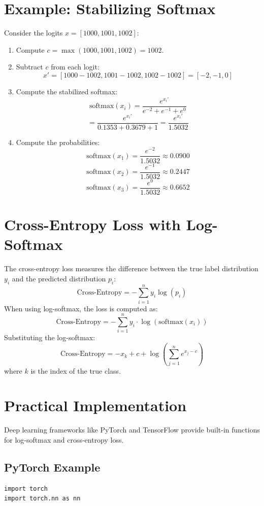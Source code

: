 \begin{notechapter}
\section{Example: Stabilizing Softmax}
Consider the logits \( x = [1000, 1001, 1002] \):
\begin{enumerate}
    \item Compute \( c = \max(1000, 1001, 1002) = 1002 \).
    \item Subtract \( c \) from each logit:
    \[
    x' = [1000 - 1002, 1001 - 1002, 1002 - 1002] = [-2, -1, 0]
    \]
    \item Compute the stabilized softmax:
    \[
    \text{softmax}(x_i) = \frac{e^{x_i'}}{e^{-2} + e^{-1} + e^{0}}
    \]
    \[
    = \frac{e^{x_i'}}{0.1353 + 0.3679 + 1} = \frac{e^{x_i'}}{1.5032}
    \]
    \item Compute the probabilities:
    \[
    \text{softmax}(x_1) = \frac{e^{-2}}{1.5032} \approx 0.0900
    \]
    \[
    \text{softmax}(x_2) = \frac{e^{-1}}{1.5032} \approx 0.2447
    \]
    \[
    \text{softmax}(x_3) = \frac{e^{0}}{1.5032} \approx 0.6652
    \]
\end{enumerate}

\section{Cross-Entropy Loss with Log-Softmax}
The cross-entropy loss measures the difference between the true label 
distribution \( y_i \) and the predicted distribution \( p_i \):
\[
\text{Cross-Entropy} = -\sum_{i=1}^n y_i \log(p_i)
\]
When using log-softmax, the loss is computed as:
\[
\text{Cross-Entropy} = -\sum_{i=1}^n y_i \cdot \log(\text{softmax}(x_i))
\]
Substituting the log-softmax:
\[
\text{Cross-Entropy} = -x_k + c + \log\left(\sum_{j=1}^n e^{x_j - c}\right)
\]
where \( k \) is the index of the true class.

\section{Practical Implementation}
Deep learning frameworks like PyTorch and TensorFlow provide built-in 
functions for log-softmax and cross-entropy loss.

\subsection{PyTorch Example}
\begin{verbatim}
import torch
import torch.nn as nn


\end{verbatim}
\end{notechapter}
